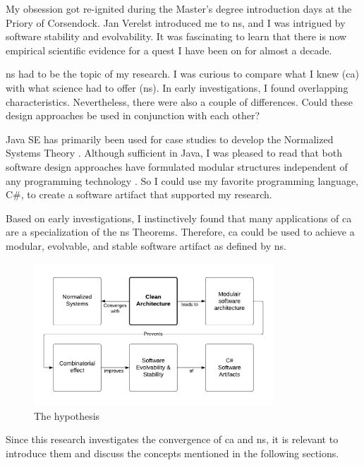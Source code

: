 My obsession got re-ignited during the Master's degree introduction days at the Priory of
Corsendock. Jan Verelst introduced me to \gls{ns}, and I was intrigued by software
stability and evolvability. It was fascinating to learn that there is now empirical
scientific evidence for a quest I have been on for almost a decade. 

\gls{ns} had to be the topic of my research. I was curious to compare what I knew
(\gls{ca}) with what science had to offer (\gls{ns}). In early investigations, I found
overlapping characteristics. Nevertheless, there were also a couple of differences. Could
these design approaches be used in conjunction with each other? 

Java SE has primarily been used for case studies to develop the Normalized
Systems Theory \parencite{oorts_building_2014, de_bruyn_enabling_2018}. Although
sufficient in Java, I was pleased to read that both software design approaches have
formulated modular structures independent of any programming technology
\parencite{mannaert_normalized_2009,robert_c_martin_clean_2018}. So I could use my
favorite programming language, C\#, to create a software artifact that supported my
research. 

Based on early investigations, I instinctively found that many applications of \gls{ca}
are a specialization of the \gls{ns} Theorems. Therefore, \gls{ca} could be used to
achieve a modular, evolvable, and stable software artifact as defined by \gls{ns}.

\begin{figure}[H]
    \centering
    \includegraphics[width=0.8\textwidth]{figures/hypothesis.pdf}
    \caption[My hypothesis]{The hypothesis}
    \label{fig_hypothesis}
\end{figure}

Since this research investigates the convergence of \gls{ca} and \gls{ns}, it is relevant
to introduce them and discuss the concepts mentioned in the following sections.



